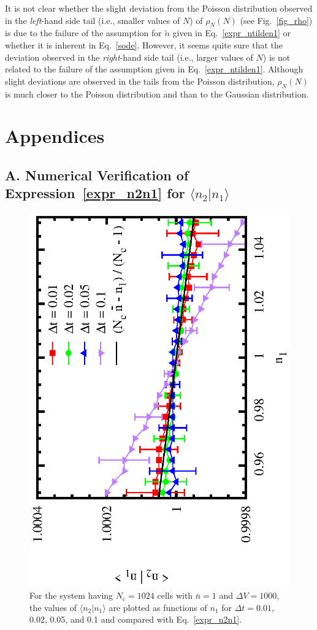 \documentclass{article}
\newcommand{\dV}{{\Delta V}}
\newcommand{\Nc}{{N_\mathrm{c}}}
\newcommand{\nb}{\bar{n}}
\begin{document}
It is not clear whether the slight deviation from the Poisson distribution observed in the \textit{left}-hand side tail (i.e., smaller values of $N$) of $\rho_N(N)$ (see Fig.~\ref{fig_rho}) is due to the failure of the assumption for $\tilde{n}$ given in Eq.~\eqref{expr_ntilden1} or whether it is inherent in Eq.~\eqref{sode}.
However, it seems quite sure that the deviation observed in the \textit{right}-hand side tail (i.e., larger values of $N$) is not related to the failure of the assumption given in Eq.~\eqref{expr_ntilden1}.
Although slight deviations are observed in the tails from the Poisson distribution, $\rho_N(N)$ is much closer to the Poisson distribution and than to the Gaussian distribution.

\clearpage

\section*{Appendices}

\subsection*{A. Numerical Verification of Expression~\eqref{expr_n2n1} for $\langle n_2|n_1\rangle$}

\begin{figure}
\begin{center}
\includegraphics[angle=270,width=0.4\linewidth]{fig4/n1n2_Nc1024.eps}
\caption{\label{fig_condexp}For the system having $\Nc=1024$ cells with $\nb=1$ and $\dV=1000$, the values of $\langle n_2|n_1\rangle$ are plotted as functions of $n_1$ for $\Delta t = 0.01$, 0.02, 0.05, and 0.1 and compared with Eq.~\eqref{expr_n2n1}.}
\end{center}
\end{figure}
\end{document}
